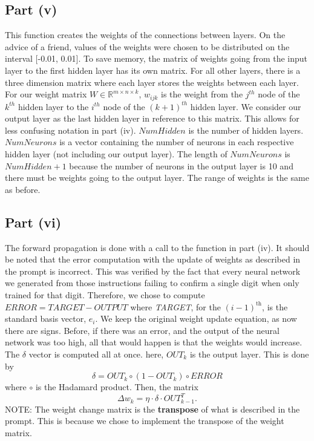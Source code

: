 \documentclass[12pt]{article}
\newcommand{\R}{\mathbb{R}}
\begin{document}
\subsection*{Part (v)}
This function creates the weights of the connections between layers.
On the advice of a friend, values of the weights were chosen to be distributed on the interval [-0.01, 0.01].
To save memory, the matrix of weights going from the input layer to the first hidden layer has its own matrix.
For all other layers, there is a three dimension matrix where each layer stores the weights between each layer.
For our weight matrix $W\in\R^{m\times n\times k}$, $w_{ijk}$ is the weight from the $j^{th}$ node of the $k^{th}$ hidden layer to the $i^{th}$ node of the $(k+1)^{th}$ hidden layer. We consider our output layer as the last hidden layer in reference to this matrix.
This allows for less confusing notation in part (iv).
$NumHidden$ is the number of hidden layers.
$NumNeurons$ is a vector containing the number of neurons in each respective hidden layer (not including our output layer).
The length of $NumNeurons$ is $NumHidden+1$ because the number of neurons in the output layer is 10 and there must be weights going to the output layer.
The range of weights is the same as before.
\subsection*{Part (vi)}
The forward propagation is done with a call to the function in part (iv).
It should be noted that the error computation with the update of 
weights as described in the prompt is incorrect.
This was verified by the fact that every neural network we generated from those instructions failing to confirm a single digit when only trained for that digit.
Therefore, we chose to compute $ERROR=TARGET-OUTPUT$ where \emph{TARGET}, for the $(i-1)^\text{th}$, is the standard basis vector, $e_i$.
We keep the original weight update equation, as now there are signs.
Before, if there was an error, and the output of the neural network was too high, all that would happen is that the weights would increase.
The $\delta$ vector is computed all at once.
here, $OUT_k$ is the output layer.
This is done by \[\delta = OUT_k \circ (1-OUT_k) \circ ERROR\]
where $\circ$ is the Hadamard product.
Then, the matrix \[\Delta w_k = \eta \cdot \delta \cdot OUT_{k-1}^T.\]
NOTE: The weight change matrix is the \textbf{transpose} of what is described in the prompt.  
This is because we chose to implement the transpose of the weight matrix.
\end{document}
